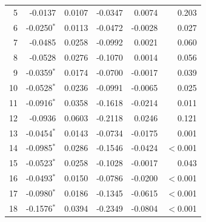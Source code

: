 \begin{longtable}{rrrrrr}
5 & -0.0137 & 0.0107 & -0.0347 & 0.0074 & 0.203 \\
6 & -0.0250$^{*}$ & 0.0113 & -0.0472 & -0.0028 & 0.027 \\
7 & -0.0485 & 0.0258 & -0.0992 & 0.0021 & 0.060 \\
8 & -0.0528 & 0.0276 & -0.1070 & 0.0014 & 0.056 \\
9 & -0.0359$^{*}$ & 0.0174 & -0.0700 & -0.0017 & 0.039 \\
10 & -0.0528$^{*}$ & 0.0236 & -0.0991 & -0.0065 & 0.025 \\
11 & -0.0916$^{*}$ & 0.0358 & -0.1618 & -0.0214 & 0.011 \\
12 & -0.0936 & 0.0603 & -0.2118 & 0.0246 & 0.121 \\
13 & -0.0454$^{*}$ & 0.0143 & -0.0734 & -0.0175 & 0.001 \\
14 & -0.0985$^{*}$ & 0.0286 & -0.1546 & -0.0424 & $<$0.001 \\
15 & -0.0523$^{*}$ & 0.0258 & -0.1028 & -0.0017 & 0.043 \\
16 & -0.0493$^{*}$ & 0.0150 & -0.0786 & -0.0200 & $<$0.001 \\
17 & -0.0980$^{*}$ & 0.0186 & -0.1345 & -0.0615 & $<$0.001 \\
18 & -0.1576$^{*}$ & 0.0394 & -0.2349 & -0.0804 & $<$0.001 \\
\end{longtable}
